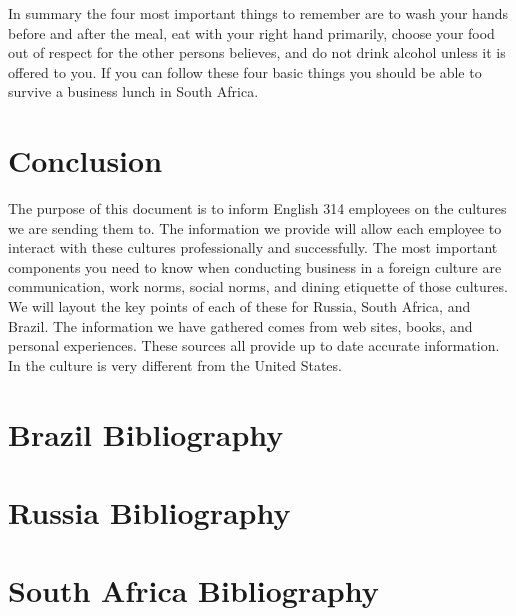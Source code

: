 \documentclass[11pt,a4paper,twoside]{report}
\begin{document}
In summary the four most important things to remember are to wash your hands
before and after the meal, eat with your right hand primarily, choose your food
out of respect for the other persons believes, and do not drink alcohol unless
it is offered to you. If you can follow these four basic things you should be
able to survive a business lunch in South Africa.

\chapter{Conclusion}

The purpose of this document is to inform English 314 employees on the cultures
we are sending them to.  The information we provide will allow each employee to
interact with these cultures professionally and successfully. The most
important components you need to know when conducting business in a foreign
culture are communication, work norms, social norms, and dining etiquette of
those cultures. We will layout the key points of each of these for Russia,
South Africa, and Brazil. The information we have gathered comes from web
sites, books, and personal experiences. These sources all provide up to date
accurate information. In the culture is very different from the United
States. \cite{cite1} \cite{cite2}

\appendix

\chapter{Brazil Bibliography}




\chapter{Russia Bibliography}




\chapter{South Africa Bibliography}



\end{document}
